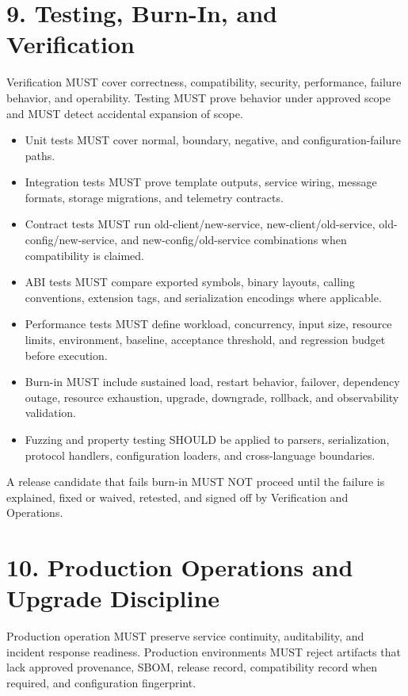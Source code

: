 \documentclass[11pt]{article}
\begin{document}
\hypertarget{sec-testing-burn-in}{}
\section*{9. Testing, Burn-In, and Verification}
Verification MUST cover correctness, compatibility, security, performance, failure behavior, and operability. Testing MUST prove behavior under approved scope and MUST detect accidental expansion of scope.

\begin{itemize}
  \item Unit tests MUST cover normal, boundary, negative, and configuration-failure paths.
  \item Integration tests MUST prove template outputs, service wiring, message formats, storage migrations, and telemetry contracts.
  \item Contract tests MUST run old-client/new-service, new-client/old-service, old-config/new-service, and new-config/old-service combinations when compatibility is claimed.
  \item ABI tests MUST compare exported symbols, binary layouts, calling conventions, extension tags, and serialization encodings where applicable.
  \item Performance tests MUST define workload, concurrency, input size, resource limits, environment, baseline, acceptance threshold, and regression budget before execution.
  \item Burn-in MUST include sustained load, restart behavior, failover, dependency outage, resource exhaustion, upgrade, downgrade, rollback, and observability validation.
  \item Fuzzing and property testing SHOULD be applied to parsers, serialization, protocol handlers, configuration loaders, and cross-language boundaries.
\end{itemize}
A release candidate that fails burn-in MUST NOT proceed until the failure is explained, fixed or waived, retested, and signed off by Verification and Operations.


\hypertarget{sec-production-operations}{}
\section*{10. Production Operations and Upgrade Discipline}
Production operation MUST preserve service continuity, auditability, and incident response readiness. Production environments MUST reject artifacts that lack approved provenance, SBOM, release record, compatibility record when required, and configuration fingerprint.
\end{document}
